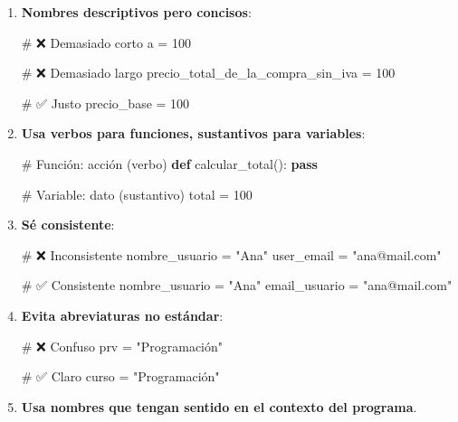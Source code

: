 \documentclass[
  doc,
  floatsintext,
  longtable,
  a4paper,
  nolmodern,
  notxfonts,
  notimes,
  12pt,
  colorlinks=true,linkcolor=blue,citecolor=blue,urlcolor=blue]{apa7}
\newenvironment{Shaded}{\begin{snugshade}}{\end{snugshade}}
\newcommand{\CommentTok}[1]{\textcolor[rgb]{0.37,0.37,0.37}{#1}}
\newcommand{\ControlFlowTok}[1]{\textcolor[rgb]{0.00,0.23,0.31}{\textbf{#1}}}
\newcommand{\DecValTok}[1]{\textcolor[rgb]{0.68,0.00,0.00}{#1}}
\newcommand{\KeywordTok}[1]{\textcolor[rgb]{0.00,0.23,0.31}{\textbf{#1}}}
\newcommand{\NormalTok}[1]{\textcolor[rgb]{0.00,0.23,0.31}{#1}}
\newcommand{\OperatorTok}[1]{\textcolor[rgb]{0.37,0.37,0.37}{#1}}
\newcommand{\StringTok}[1]{\textcolor[rgb]{0.13,0.47,0.30}{#1}}
\begin{document}
\begin{enumerate}
\def\labelenumi{\arabic{enumi}.}
\item
  \textbf{Nombres descriptivos pero concisos}:

\begin{Shaded}
\begin{Highlighting}[]
\CommentTok{\# ❌ Demasiado corto}
\NormalTok{a }\OperatorTok{=} \DecValTok{100}

\CommentTok{\# ❌ Demasiado largo}
\NormalTok{precio\_total\_de\_la\_compra\_sin\_iva }\OperatorTok{=} \DecValTok{100}

\CommentTok{\# ✅ Justo}
\NormalTok{precio\_base }\OperatorTok{=} \DecValTok{100}
\end{Highlighting}
\end{Shaded}
\item
  \textbf{Usa verbos para funciones, sustantivos para variables}:

\begin{Shaded}
\begin{Highlighting}[]
\CommentTok{\# Función: acción (verbo)}
\KeywordTok{def}\NormalTok{ calcular\_total():}
    \ControlFlowTok{pass}

\CommentTok{\# Variable: dato (sustantivo)}
\NormalTok{total }\OperatorTok{=} \DecValTok{100}
\end{Highlighting}
\end{Shaded}
\item
  \textbf{Sé consistente}:

\begin{Shaded}
\begin{Highlighting}[]
\CommentTok{\# ❌ Inconsistente}
\NormalTok{nombre\_usuario }\OperatorTok{=} \StringTok{"Ana"}
\NormalTok{user\_email }\OperatorTok{=} \StringTok{"ana@mail.com"}

\CommentTok{\# ✅ Consistente}
\NormalTok{nombre\_usuario }\OperatorTok{=} \StringTok{"Ana"}
\NormalTok{email\_usuario }\OperatorTok{=} \StringTok{"ana@mail.com"}
\end{Highlighting}
\end{Shaded}
\item
  \textbf{Evita abreviaturas no estándar}:

\begin{Shaded}
\begin{Highlighting}[]
\CommentTok{\# ❌ Confuso}
\NormalTok{prv }\OperatorTok{=} \StringTok{"Programación"}

\CommentTok{\# ✅ Claro}
\NormalTok{curso }\OperatorTok{=} \StringTok{"Programación"}
\end{Highlighting}
\end{Shaded}
\item
  \textbf{Usa nombres que tengan sentido en el contexto del programa}.
\end{enumerate}
\end{document}
